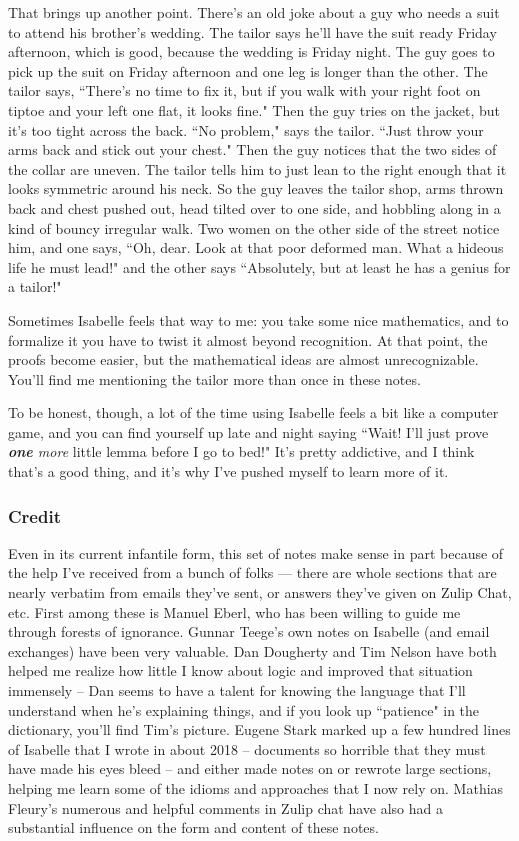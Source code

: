 That brings up another point. There's an old joke about a guy who needs a suit to attend his brother's wedding. The tailor says he'll have the suit ready Friday afternoon, which is good, because the wedding is Friday night. The guy goes to pick up the suit on Friday afternoon and one leg is longer than the other. The tailor says, ``There's no time to fix it, but if you walk with your right foot on tiptoe and your left one flat, it looks fine." Then the guy tries on the jacket, but it's too tight across the back. ``No problem," says the tailor. ``Just throw your arms back and stick out your chest." Then the guy notices that the two sides of the collar are uneven. The tailor tells him to just lean to the right enough that it looks symmetric around his neck. So the guy leaves the tailor shop, arms thrown back and chest pushed out, head tilted over to one side, and hobbling along in a kind of bouncy irregular walk. Two women on the other side of the street notice him, and one says, ``Oh, dear. Look at that poor deformed man. What a hideous life he must lead!" and the other says ``Absolutely, but at least he has a genius for a tailor!" 

Sometimes Isabelle feels that way to me: you take some nice mathematics, and to formalize it you have to twist it almost beyond recognition. At that point, the proofs become easier, but the mathematical ideas are almost unrecognizable. You'll find me mentioning the tailor more than once in these notes.

To be honest, though, a lot of the time using Isabelle feels a bit like a computer game, and you can find yourself up late and night saying ``Wait! I'll just prove \textit{\textbf{one} more} little lemma before I go to bed!" It's pretty addictive, and I think that's a good thing, and it's why I've pushed myself to learn more of it.  

\subsubsection{Credit}
Even in its current infantile form, this set of notes make sense in part because of the help I've received from a bunch of folks --- there are whole sections that are nearly verbatim from emails they've sent, or answers they've given on Zulip Chat, etc. First among these is Manuel Eberl, who has been willing to guide me through forests of ignorance. Gunnar Teege's own notes on Isabelle (and email exchanges) have been very valuable. Dan Dougherty and Tim Nelson have both helped me realize how little I know about logic and improved that situation immensely -- Dan seems to have a talent for knowing the language that I'll understand when he's explaining things, and if you look up ``patience" in the dictionary, you'll find Tim's picture. Eugene Stark marked up a few hundred lines of Isabelle that I wrote in about 2018 -- documents so horrible that they must have made his eyes bleed -- and either made notes on or rewrote large sections, helping me learn some of the idioms and approaches that I now rely on. Mathias Fleury's numerous and helpful comments in Zulip chat have also had a substantial influence on the form and content of these notes. 